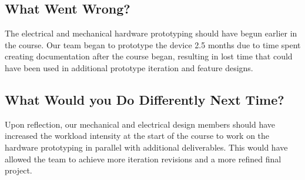 \documentclass[12pt]{article}
\begin{document}
\subsection{What Went Wrong?}


The electrical and mechanical hardware prototyping should have begun earlier in the course. Our team began to prototype the device 2.5 months due to time spent creating documentation after the course began, resulting in lost time that could have been used in additional prototype iteration and feature designs. 

\subsection{What Would you Do Differently Next Time?}


Upon reflection, our mechanical and electrical design members should have increased the workload intensity at the start of the course to work on the hardware prototyping in parallel with additional deliverables. This would have allowed the team to achieve more iteration revisions and a more refined final project. \\
\end{document}
